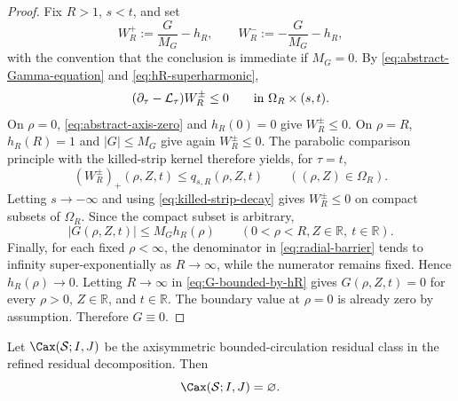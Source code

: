 \begin{proof}
Fix \(R>1\), \(s<t\), and set
\[
   W^+_{R}:=\frac{G}{M_G}-h_R,
   \qquad
   W^-_{R}:=-\frac{G}{M_G}-h_R,
\]
with the convention that the conclusion is immediate if \(M_G=0\).
By \eqref{eq:abstract-Gamma-equation} and \eqref{eq:hR-superharmonic},
\[
   (\partial_\tau-\mathcal L_\tau)W_R^\pm\le0
   \qquad\hbox{in }\Omega_R\times(s,t).
\]
On \(\rho=0\), \eqref{eq:abstract-axis-zero} and \(h_R(0)=0\) give
\(W_R^\pm\le0\).  On \(\rho=R\), \(h_R(R)=1\) and \(|G|\le M_G\) give again
\(W_R^\pm\le0\).  The parabolic comparison principle with the killed-strip
kernel therefore yields, for \(\tau=t\),
\[
   (W_R^\pm)_+(\rho,Z,t)
   \le q_{s,R}(\rho,Z,t)
   \qquad ((\rho,Z)\in\Omega_R).
\]
Letting \(s\to-\infty\) and using \eqref{eq:killed-strip-decay} gives
\(W_R^\pm\le0\) on compact subsets of \(\Omega_R\).  Since the compact subset
is arbitrary,
\begin{equation}\label{eq:G-bounded-by-hR}
   |G(\rho,Z,t)|\le M_G h_R(\rho)
   \qquad (0<\rho<R, Z\in\mathbb R,
   \ t\in\mathbb R).
\end{equation}
Finally, for each fixed \(\rho<\infty\), the denominator in
\eqref{eq:radial-barrier} tends to infinity super-exponentially as
\(R\to\infty\), while the numerator remains fixed.  Hence
\(h_R(\rho)\to0\).  Letting \(R\to\infty\) in
\eqref{eq:G-bounded-by-hR} gives \(G(\rho,Z,t)=0\) for every
\(\rho>0\), \(Z\in\mathbb R\), and \(t\in\mathbb R\).  The boundary value at
\(\rho=0\) is already zero by assumption.  Therefore \(G\equiv0\).
\end{proof}

\begin{theorem}
\label{thm:R1-exclusion}
Let \(\Cax(\mathcal S;I,J)\) be the axisymmetric bounded-circulation residual
class in the refined residual decomposition.  Then
\begin{equation}\label{eq:R1-empty}
   \Cax(\mathcal S;I,J)=\varnothing .
\end{equation}
\end{theorem}

